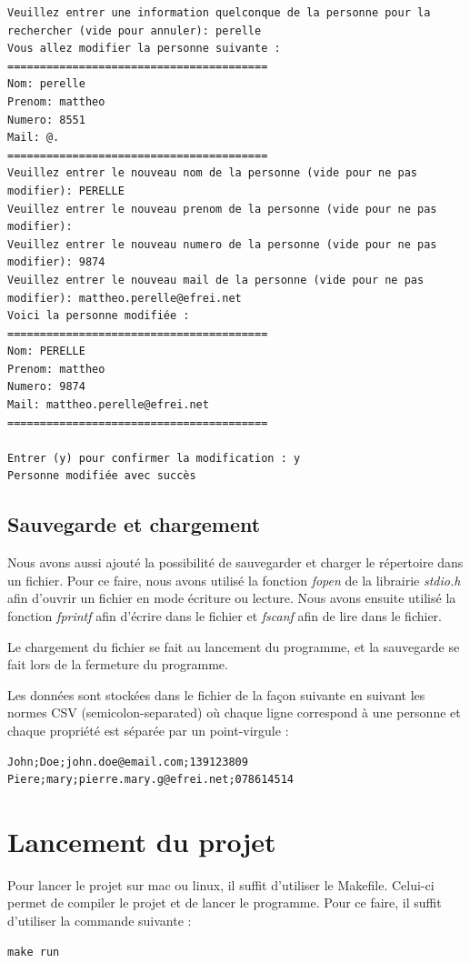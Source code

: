 \documentclass[12pt]{report}
\begin{document}
\begin{verbatim}
Veuillez entrer une information quelconque de la personne pour la rechercher (vide pour annuler): perelle
Vous allez modifier la personne suivante :
========================================
Nom: perelle
Prenom: mattheo
Numero: 8551
Mail: @.
========================================
Veuillez entrer le nouveau nom de la personne (vide pour ne pas modifier): PERELLE
Veuillez entrer le nouveau prenom de la personne (vide pour ne pas modifier):
Veuillez entrer le nouveau numero de la personne (vide pour ne pas modifier): 9874
Veuillez entrer le nouveau mail de la personne (vide pour ne pas modifier): mattheo.perelle@efrei.net
Voici la personne modifiée :
========================================
Nom: PERELLE
Prenom: mattheo
Numero: 9874
Mail: mattheo.perelle@efrei.net
========================================

Entrer (y) pour confirmer la modification : y
Personne modifiée avec succès
\end{verbatim}

\section{Sauvegarde et chargement}
Nous avons aussi ajouté la possibilité de sauvegarder et charger le répertoire dans un fichier. Pour ce faire, nous avons utilisé la fonction \textit{fopen} de la librairie \textit{stdio.h} afin d'ouvrir un fichier en mode écriture ou lecture. Nous avons ensuite utilisé la fonction \textit{fprintf} afin d'écrire dans le fichier et \textit{fscanf} afin de lire dans le fichier.

Le chargement du fichier se fait au lancement du programme, et la sauvegarde se fait lors de la fermeture du programme.

Les données sont stockées dans le fichier de la façon suivante en suivant les normes CSV (semicolon-separated) où chaque ligne correspond à une personne et chaque propriété est séparée par un point-virgule :
\begin{verbatim}
John;Doe;john.doe@email.com;139123809
Piere;mary;pierre.mary.g@efrei.net;078614514
\end{verbatim}

\chapter{Lancement du projet}
Pour lancer le projet sur mac ou linux, il suffit d'utiliser le Makefile. Celui-ci permet de compiler le projet et de lancer le programme. Pour ce faire, il suffit d'utiliser la commande suivante :
\begin{verbatim}
make run
\end{verbatim}
\end{document}
